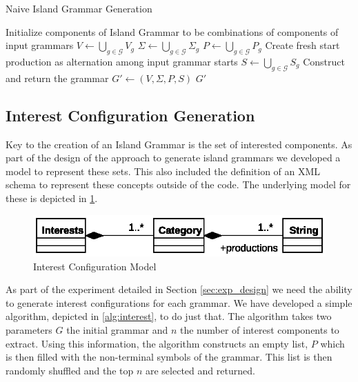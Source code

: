 \documentclass[10pt,nocc]{xrese_report}
\begin{document}
\begin{algorithm}[tb]
 \caption{Naive Island Grammar Generation}\label{alg:nmigg}

 \begin{algorithmic}[1]
    \LineComment Initialize components of Island Grammar to be combinations of components of input grammars
    \State $V \gets \bigcup_{g \in \mathcal{G}} V_g$
    \State $\Sigma \gets \bigcup_{g \in \mathcal{G}} \Sigma_g$
    \State $P \gets \bigcup_{g \in \mathcal{G}} P_g$
    \LineComment Create fresh start production as alternation among input grammar starts
    \State $S \gets \bigcup_{g \in \mathcal{G}} S_g$
    \LineComment Construct and return the grammar
    \State $G' \gets (V, \Sigma, P, S)$
    \State \Return $G'$
   \EndProcedure
 \end{algorithmic}
\end{algorithm}

\subsection{Interest Configuration Generation}

Key to the creation of an Island Grammar is the set of interested components. As part of the design of the approach to generate island grammars we developed a model to represent these sets. This also included the definition of an XML schema to represent these concepts outside of the code. The underlying model for these is depicted in \ref{fig:interest}.

\begin{figure}
 \begin{center}
 \includegraphics{images/paper/interests.eps}
 \caption{Interest Configuration Model}\label{fig:interest} 
 \end{center}
\end{figure}


As part of the experiment detailed in Section \ref{sec:exp_design} we need the ability to generate interest configurations for each grammar. We have developed a simple algorithm, depicted in \ref{alg:interest}, to do just that. The algorithm takes two parameters $G$ the initial grammar and $n$ the number of interest components to extract. Using this information, the algorithm constructs an empty list, $P$ which is then filled with the non-terminal symbols of the grammar. This list is then randomly shuffled and the top $n$ are selected and returned.
\end{document}
